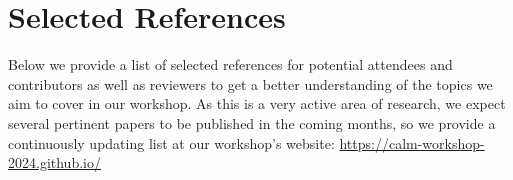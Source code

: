\documentclass{article}
\begin{document}
\section{Selected References}

Below we provide a list of selected references for potential attendees and contributors as well as reviewers to get a better understanding of the topics we aim to cover in our workshop. As this is a very active area of research, we expect several pertinent papers to be published in the coming months, so we provide a continuously updating list at our workshop's website: \url{https://calm-workshop-2024.github.io/}



\renewcommand{\bibsection}{}


\nocite{liuLargeLanguageModels2024, anwar2024foundational, jin2024cladder, kasetty2024evaluating,park2023linear,zevcevic2023causal,vashishtha2023causal, reizinger2024understanding}
\nocite{gupta2024context_is_env, lampinen2023passive}
\nocite{kiciman2023causal}
\nocite{daunhawer2023identifiability}







\end{document}
